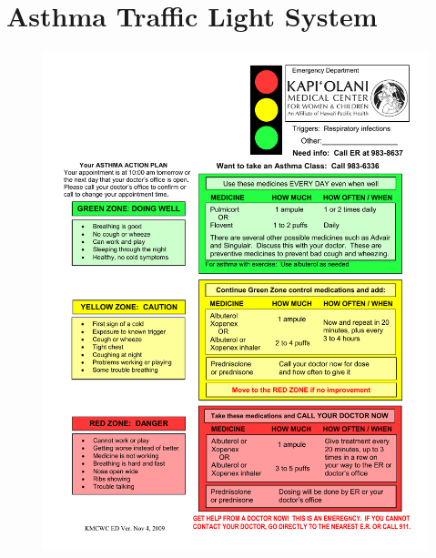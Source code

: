 \chapter{Asthma Traffic Light System}
\label{chp:traffic-light}
\begin{figure}[H]
	\centering
	\includegraphics[scale=0.50]{Appendices/KapiolaniEDAsthmaActionPlan.pdf}
\end{figure}
